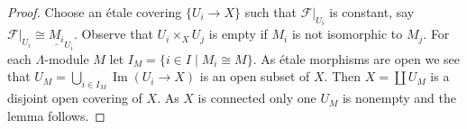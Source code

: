 \documentclass[10pt,a4paper]{amsart}
\theoremstyle{plain}
\theoremstyle{definition}
\theoremstyle{remark}
\numberwithin{equation}{subsection}
\def\Im{\mathop{\mathrm{Im}}}
\begin{document}
\begin{proof}
Choose an \'etale covering
$\{U_i \to X\}$ such that $\mathcal{F}|_{U_i}$ is constant, say
$\mathcal{F}|_{U_i} \cong \underline{M_i}_{U_i}$.
Observe that $U_i \times_X U_j$ is empty if $M_i$ is not isomorphic
to $M_j$.
For each $\Lambda$-module $M$ let $I_M = \{i \in I \mid M_i \cong M\}$.
As \'etale morphisms are open we see that
$U_M = \bigcup_{i \in I_M} \Im(U_i \to X)$
is an open subset of $X$. Then $X = \coprod U_M$ is a disjoint
open covering of $X$. As $X$ is connected only one $U_M$ is nonempty
and the lemma follows.
\end{proof}
\end{document}
